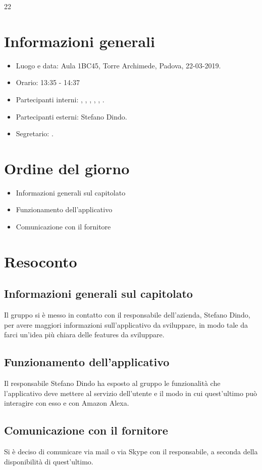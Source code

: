 
22\section{Informazioni generali}
\begin{itemize}
    \item Luogo e data: Aula 1BC45, Torre Archimede, Padova, 22-03-2019.
    \item Orario: 13:35 - 14:37
    \item Partecipanti interni: \valentin{}, \francesco{}, \daniele{}, \singh{}, \davide{}, \andrea{}.
    \item Partecipanti esterni: Stefano Dindo.
    \item Segretario: \andrea{}.
\end{itemize}

\section{Ordine del giorno}
\begin{itemize}
    \item Informazioni generali sul capitolato
    \item Funzionamento dell'applicativo
    \item Comunicazione con il fornitore
\end{itemize}

\section{Resoconto}
\subsection{Informazioni generali sul capitolato}
Il gruppo si è messo in contatto con il responsabile dell'azienda, Stefano Dindo, per avere maggiori informazioni sull'applicativo da sviluppare, in modo tale da farci un'idea più chiara delle features da sviluppare.
\subsection{Funzionamento dell'applicativo}
Il responsabile Stefano Dindo ha esposto al gruppo le funzionalità che l'applicativo deve mettere al servizio dell'utente e il modo in cui quest'ultimo può interagire con esso e con Amazon Alexa.
\subsection{Comunicazione con il fornitore}
Si è deciso di comunicare via mail o via Skype con il responsabile, a seconda della disponibilità di quest'ultimo.